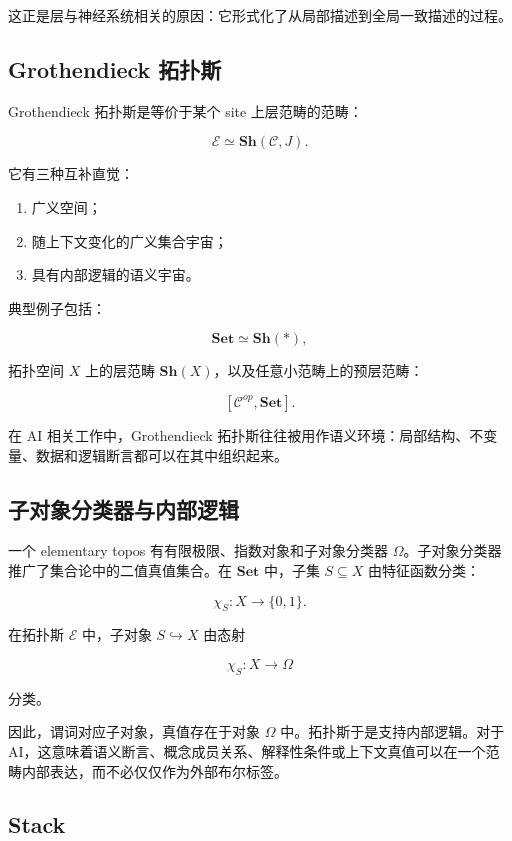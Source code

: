 \documentclass[UTF8,11pt,fontset=none]{ctexart}
\begin{document}
这正是层与神经系统相关的原因：它形式化了从局部描述到全局一致描述的过程。


\subsection{Grothendieck 拓扑斯}

Grothendieck 拓扑斯是等价于某个 site 上层范畴的范畴：


\[
\mathcal{E}\simeq\mathbf{Sh}(\mathcal{C},J).
\]

它有三种互补直觉：


\begin{enumerate}
\item 广义空间；
\item 随上下文变化的广义集合宇宙；
\item 具有内部逻辑的语义宇宙。
\end{enumerate}

典型例子包括：


\[
\mathbf{Set}\simeq\mathbf{Sh}(*),
\]

拓扑空间 \(X\) 上的层范畴 \(\mathbf{Sh}(X)\)，以及任意小范畴上的预层范畴：


\[
[\mathcal{C}^{op},\mathbf{Set}].
\]

在 AI 相关工作中，Grothendieck 拓扑斯往往被用作语义环境：局部结构、不变量、数据和逻辑断言都可以在其中组织起来。


\subsection{子对象分类器与内部逻辑}

一个 elementary topos 有有限极限、指数对象和子对象分类器 \(\Omega\)。子对象分类器推广了集合论中的二值真值集合。在 \(\mathbf{Set}\) 中，子集 \(S\subseteq X\) 由特征函数分类：


\[
\chi_S:X\to\{0,1\}.
\]

在拓扑斯 \(\mathcal{E}\) 中，子对象 \(S\hookrightarrow X\) 由态射


\[
\chi_S:X\to\Omega
\]

分类。


因此，谓词对应子对象，真值存在于对象 \(\Omega\) 中。拓扑斯于是支持内部逻辑。对于 AI，这意味着语义断言、概念成员关系、解释性条件或上下文真值可以在一个范畴内部表达，而不必仅仅作为外部布尔标签。


\subsection{Stack}
\end{document}
